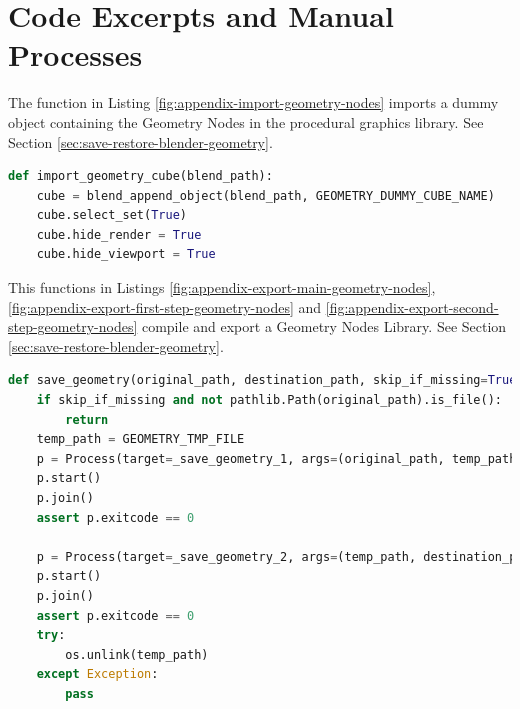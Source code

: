 \chapter{Code Excerpts and Manual Processes}

The function in Listing \ref{fig:appendix-import-geometry-nodes} imports a dummy object containing the Geometry Nodes in the procedural graphics library. See Section \ref{sec:save-restore-blender-geometry}.
\begin{lstlisting}[language=python,caption={Geometry Nodes - Import Function},label={fig:appendix-import-geometry-nodes}]
def import_geometry_cube(blend_path):
    cube = blend_append_object(blend_path, GEOMETRY_DUMMY_CUBE_NAME)
    cube.select_set(True)
    cube.hide_render = True
    cube.hide_viewport = True
\end{lstlisting}


This functions in Listings \ref{fig:appendix-export-main-geometry-nodes}, \ref{fig:appendix-export-first-step-geometry-nodes} and \ref{fig:appendix-export-second-step-geometry-nodes}  compile and export a Geometry Nodes Library. See Section \ref{sec:save-restore-blender-geometry}.

\begin{lstlisting}[language=python,caption={Geometry Nodes - Export - Main Function},label={fig:appendix-export-main-geometry-nodes}]
def save_geometry(original_path, destination_path, skip_if_missing=True):
    if skip_if_missing and not pathlib.Path(original_path).is_file():
        return
    temp_path = GEOMETRY_TMP_FILE
    p = Process(target=_save_geometry_1, args=(original_path, temp_path, skip_if_missing))
    p.start()
    p.join()
    assert p.exitcode == 0

    p = Process(target=_save_geometry_2, args=(temp_path, destination_path, skip_if_missing))
    p.start()
    p.join()
    assert p.exitcode == 0
    try:
        os.unlink(temp_path)
    except Exception:
        pass
\end{lstlisting}


